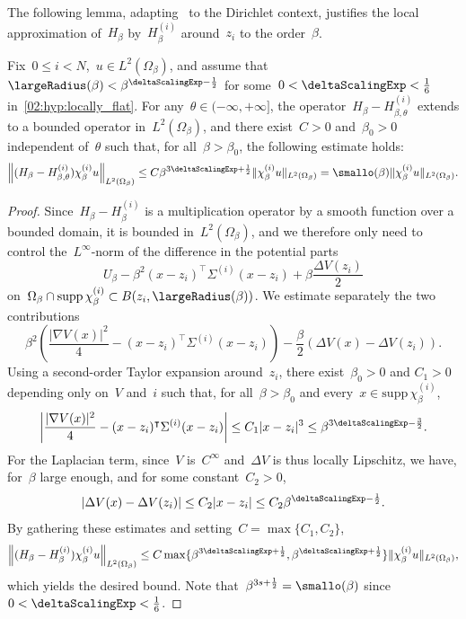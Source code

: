     The following lemma, adapting~\cite[Equations 11.5--7]{CFKS87} to the Dirichlet context, justifies the local approximation of~$H_\beta$ by~$H_\beta^{(i)}$ around~$z_i$ to the order~$\beta$.
    \begin{lemma}
        \label{02:lemma:taylor_bound}
        Fix~$0\leq i <N$,~$u\in L^2(\Omega_\beta)$, and assume that~$\largeRadius(\beta)<\beta^{\deltaScalingExp-\frac12}$ for some~$0<\deltaScalingExp<\frac16$ in~\eqref{02:hyp:locally_flat}.
        For any~$\theta\in(-\infty,+\infty]$, the operator~$H_\beta-H_{\beta,\theta}^{(i)}$ extends to a bounded operator in~$L^2(\Omega_\beta)$, and
        there exist~$C>0$ and~$\beta_0>0$ independent of~$\theta$ such that, for all~$\beta>\beta_0$, the following estimate holds:
        \begin{equation}
            \label{02:eq:taylor_bound_witten}
            \left\|(H_\beta-H_{\beta,\theta}^{(i)})\chi_\beta^{(i)} u\right\|_{L^2(\Omega_\beta)} \leq C\beta^{3\deltaScalingExp+\frac12}\|\chi_\beta^{(i)}u\|_{L^2(\Omega_\beta)} = \smallo(\beta)\|\chi_\beta^{(i)}u\|_{L^2(\Omega_\beta)}.
        \end{equation}
    \end{lemma}
    \begin{proof}
        Since~$H_\beta-H_\beta^{(i)}$ is a multiplication operator by a smooth function over a bounded domain, it is bounded in~$L^2(\Omega_\beta)$, and we therefore only need to control the~$L^\infty$-norm of the difference in the potential parts
       ~$$U_\beta - \beta^2(x-z_i)^\intercal \Sigma^{(i)}(x-z_i) + \beta \frac{\Delta V(z_i)}2$$ on~$\Omega_\beta \cap\mathrm{supp}\,\chi_\beta^{(i)} \subset B(z_i,\largeRadius(\beta))$.
        We estimate separately the two contributions
       ~$$ \beta^2\left(\frac{|\nabla V(x)|^2}4 - (x-z_i)^\intercal \Sigma^{(i)}(x-z_i) \right) - \frac\beta2(\Delta V(x) - \Delta V(z_i)).$$
        Using a second-order Taylor expansion around~$z_i$, there exist~$\beta_0>0$ and $C_1>0$ depending only on~$V$ and~$i$ such that, for all~$\beta>\beta_0$ and every~$x\in \mathrm{supp}\,\chi_\beta^{(i)}$, 
       ~$$\left|\frac{|\nabla V(x)|^2}4 - (x-z_i)^\intercal \Sigma^{(i)}(x-z_i)\right| \leq C_1 |x-z_i|^3 \leq \beta^{3\deltaScalingExp-\frac32}.$$
        For the Laplacian term, since~$V$ is~$C^\infty$ and~$\Delta V$ is thus locally Lipschitz, we have, for~$\beta$ large enough, and for some constant~$C_2>0$,
       ~$$ \left| \Delta V(x) - \Delta V(z_i)\right| \leq C_2|x-z_i|\leq C_2 \beta^{\deltaScalingExp-\frac12}.$$
        By gathering these estimates and setting~$C = \max\{C_1,C_2\}$,
       ~$$\left\|(H_\beta-H_\beta^{(i)})\chi_\beta^{(i)} u\right\|_{L^2(\Omega_\beta)} \leq C\max\{\beta^{3\deltaScalingExp+\frac12},\beta^{\deltaScalingExp+\frac12}\}\|\chi_\beta^{(i)}u\|_{L^2(\Omega_\beta)},$$
        which yields the desired bound. Note that~$\beta^{3s+\frac12} = \smallo(\beta)$ since~$0<\deltaScalingExp<\frac16$.
    \end{proof}

